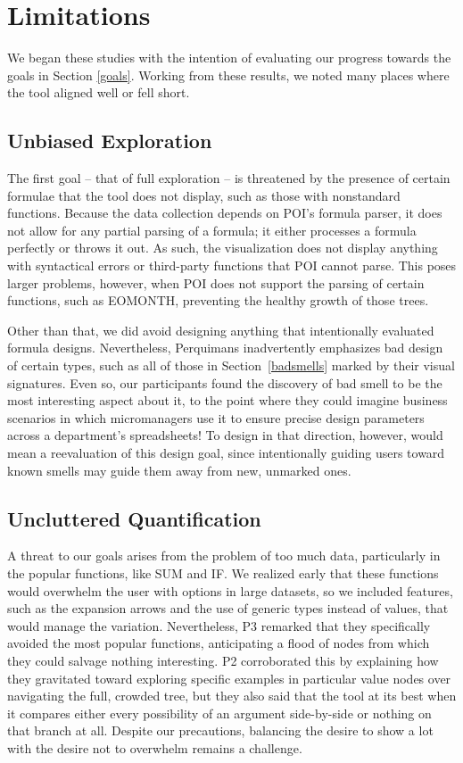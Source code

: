 \documentclass[conference]{IEEEtran}
\newcommand{\toolname}{Perquimans } \newcommand{\toolnameend}{Perquimans}
\begin{document}
	
	\section{Limitations} We began these studies with the intention of evaluating
	our progress towards the goals in Section \ref{goals}. Working from these
	results, we noted many places where the tool aligned well or fell short.
	
	\subsection{Unbiased Exploration} The first goal -- that of full exploration --
	is threatened by the presence of certain formulae that the tool does not
	display, such as those with nonstandard functions. Because the data collection
	depends on POI's formula parser, it does not allow for any partial parsing of a
	formula; it either processes a formula perfectly or throws it out. As such, the
	visualization does not display anything with syntactical errors or third-party
	functions that POI cannot parse. This poses larger problems, however, when POI
	does not support the parsing of certain functions, such as EOMONTH, preventing
	the healthy growth of those trees. \par
	
	Other than that, we did avoid designing anything that intentionally evaluated
	formula designs. Nevertheless, \toolname inadvertently emphasizes bad design of
	certain types, such as all of those in Section~\ref{badsmells} marked by their
	visual signatures. Even so, our participants found the discovery of bad smell
	to be the most interesting aspect about it, to the point where they could
	imagine business scenarios in which micromanagers use it to ensure precise
	design parameters across a department's spreadsheets! To design in that
	direction, however, would mean a reevaluation of this design goal, since
	intentionally guiding users toward known smells may guide them away from new,
	unmarked ones.
	
	\subsection{Uncluttered Quantification}
	
	A threat to our goals arises from the problem of too much data,
	particularly in the popular functions, like SUM and IF. We realized early that
	these functions would overwhelm the user with options in large datasets, so we
	included features, such as the expansion arrows and the use of generic types
	instead of values, that would manage the variation. Nevertheless, P3 remarked
	that they specifically avoided the most popular functions, anticipating a flood
	of nodes from which they could salvage nothing interesting. P2 corroborated
	this by explaining how they gravitated toward exploring specific examples in
	particular value nodes over navigating the full, crowded tree, but they also
	said that the tool at its best when it compares either every possibility of an
	argument side-by-side or nothing on that branch at all. Despite our
	precautions, balancing the desire to show a lot with the desire not to
	overwhelm remains a challenge. \par
	
\end{document}
